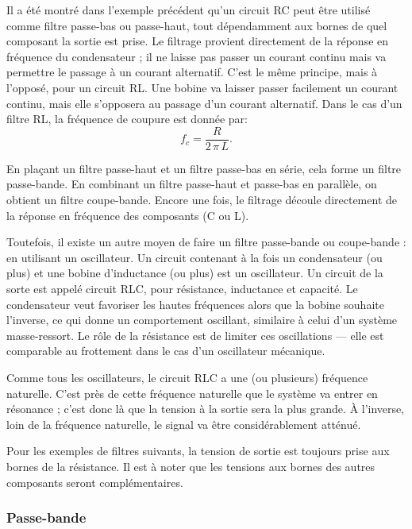 \documentclass[canadien,12pt,oneside,letterpaper]{article}
\begin{document}
Il a été montré dans l'exemple précédent qu'un circuit RC peut être utilisé comme filtre passe-bas ou passe-haut, tout dépendamment aux bornes de quel composant la sortie est prise. Le filtrage provient directement de la réponse en fréquence du condensateur ; il ne laisse pas passer un courant continu mais va permettre le passage à un courant alternatif. C'est le même principe, mais à l'opposé, pour un circuit RL. Une bobine va laisser passer facilement un courant continu, mais elle s'opposera au passage d'un courant alternatif. Dans le cas d'un filtre RL, la fréquence de coupure est donnée par:
\begin{equation}
f_c=\frac{R}{2\,\pi\,L}.
\end{equation}

En plaçant un filtre passe-haut et un filtre passe-bas en série, cela forme un filtre passe-bande. En combinant un filtre passe-haut et passe-bas en parallèle, on obtient un filtre coupe-bande. Encore une fois, le filtrage découle directement de la réponse en fréquence des composants (C ou L).

Toutefois, il existe un autre moyen de faire un filtre passe-bande ou coupe-bande : en utilisant un oscillateur. Un circuit contenant à la fois un condensateur (ou plus) et une bobine d'inductance (ou plus) est un oscillateur. Un circuit de la sorte est appelé circuit RLC, pour résistance, inductance et capacité. Le condensateur veut favoriser les hautes fréquences alors que la bobine souhaite l'inverse, ce qui donne un comportement oscillant, similaire à celui d'un système masse-ressort. Le rôle de la résistance est de limiter ces oscillations --- elle est comparable au frottement dans le cas d'un oscillateur mécanique.

Comme tous les oscillateurs, le circuit RLC a une (ou plusieurs) fréquence naturelle. C'est près de cette fréquence naturelle que le système va entrer en résonance ; c'est donc là que la tension à la sortie sera la plus grande. À l'inverse, loin de la fréquence naturelle, le signal va être considérablement atténué.

Pour les exemples de filtres suivants, la tension de sortie est toujours prise aux bornes de la résistance. Il est à noter que les tensions aux bornes des autres composants seront complémentaires.


\subsubsection{Passe-bande}
\end{document}
